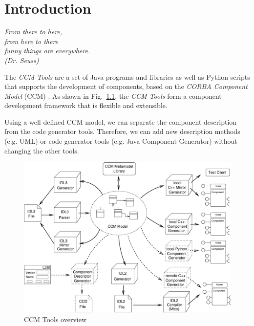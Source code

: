 
\chapter{Introduction}
\begin{flushright}
{\it From there to here, \\
     from here to there \\
     funny things are everywhere.\\
		(Dr. Seuss)}
\end{flushright}

The {\it CCM Tools} are a set of Java programs and libraries as well as Python
scripts that supports the development of components, based on the {\it CORBA
Component Model} (CCM) \cite{CCMSpecification}. As shown in Fig.~\ref{ccmtools},
the {\it CCM Tools} form a component development framework that is flexible and
extensible.

Using a well defined CCM model, we can separate the component description from
the code generator tools. Therefore, we can add new description methods (e.g.
UML) or code generator tools (e.g. Java Component Generator) without changing
the other tools.

\begin{figure}[htbp]
    \begin{center}
        \includegraphics [width=12cm,angle=0] {ComponentGeneratorTools}
        \caption{CCM Tools overview}
        \label{ccmtools}
    \end{center}
\end{figure}

